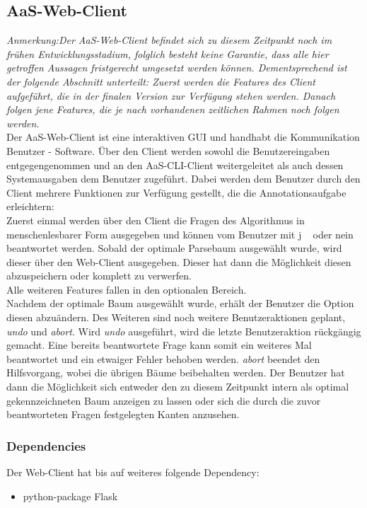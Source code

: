 \documentclass{scrartcl}
\begin{document}
\subsection{AaS-Web-Client}
\label{sub:AaS-Web-Client}
\textit{Anmerkung:Der AaS-Web-Client befindet sich zu diesem Zeitpunkt noch im frühen Entwicklungsstadium, folglich besteht keine Garantie, dass alle hier getroffen Aussagen fristgerecht umgesetzt werden können. Dementsprechend ist der folgende Abschnitt unterteilt: Zuerst werden die Features des Client aufgeführt, die in der finalen Version zur Verfügung stehen werden. Danach folgen jene Features, die je nach vorhandenen zeitlichen Rahmen noch folgen werden}.\\
Der AaS-Web-Client ist eine interaktiven GUI und handhabt die Kommunikation Benutzer - Software. Über den Client werden sowohl die Benutzereingaben entgegengenommen und an den AaS-CLI-Client weitergeleitet als auch dessen Systemausgaben dem Benutzer zugeführt.
Dabei werden dem Benutzer durch den Client mehrere Funktionen zur Verfügung gestellt, die die Annotationsaufgabe erleichtern:\\
Zuerst einmal werden über den Client die Fragen des Algorithmus in menschenlesbarer Form ausgegeben und können vom Benutzer mit \glqq j \grqq~ oder \glqq nein\grqq~ beantwortet werden. Sobald der optimale Parsebaum ausgewählt wurde, wird dieser über den Web-Client ausgegeben. Dieser hat dann die Möglichkeit diesen abzuspeichern oder komplett zu verwerfen.\\
Alle weiteren Features fallen in den optionalen Bereich.\\
Nachdem der optimale Baum ausgewählt wurde, erhält der Benutzer die Option diesen abzuändern.
Des Weiteren sind noch weitere Benutzeraktionen geplant,  \textit{undo} und \textit{abort}. Wird \textit{undo} ausgeführt, wird die letzte Benutzeraktion rückgängig gemacht. Eine bereits beantwortete Frage kann somit ein weiteres Mal beantwortet und ein etwaiger Fehler behoben werden. \textit{abort} beendet den Hilfsvorgang, wobei die übrigen Bäume beibehalten werden. Der Benutzer hat dann die Möglichkeit sich entweder den zu diesem Zeitpunkt intern als optimal gekennzeichneten Baum anzeigen zu lassen oder sich die durch die zuvor beantworteten Fragen festgelegten Kanten anzusehen.

\subsubsection{Dependencies}
\label{ssub:Web-Client-Dependencies}
Der Web-Client hat bis auf weiteres folgende Dependency:
\begin{itemize}
\item python-package Flask
\end{itemize}
\end{document}
